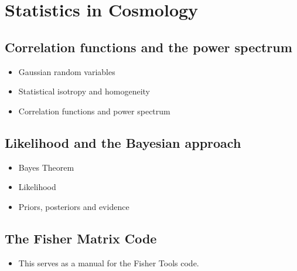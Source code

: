\chapter{Statistics in Cosmology} %

\label{Statis} %


\section{Correlation functions and the power spectrum}
\begin{itemize}
\item Gaussian random variables
\item Statistical isotropy and homogeneity
\item Correlation functions and power spectrum
\end{itemize}

\section{Likelihood and the Bayesian approach}
\begin{itemize}
\item Bayes Theorem 
\item Likelihood
\item Priors, posteriors and evidence
\end{itemize}



\section{The Fisher Matrix Code}
\begin{itemize}
\item This serves as a manual for the Fisher Tools code.
\end{itemize}


